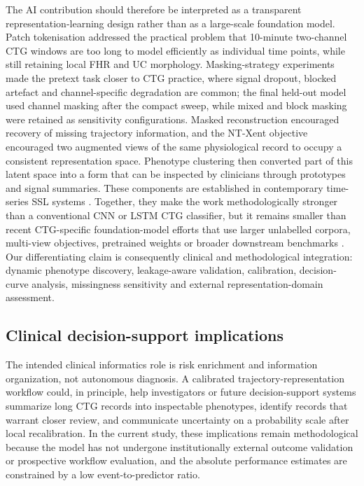 \documentclass[pdflatex,sn-nature]{sn-jnl}
\begin{document}
The AI contribution should therefore be interpreted as a transparent representation-learning design rather than as a large-scale foundation model. Patch tokenisation addressed the practical problem that 10-minute two-channel CTG windows are too long to model efficiently as individual time points, while still retaining local FHR and UC morphology. Masking-strategy experiments made the pretext task closer to CTG practice, where signal dropout, blocked artefact and channel-specific degradation are common; the final held-out model used channel masking after the compact sweep, while mixed and block masking were retained as sensitivity configurations. Masked reconstruction encouraged recovery of missing trajectory information, and the NT-Xent objective encouraged two augmented views of the same physiological record to occupy a consistent representation space. Phenotype clustering then converted part of this latent space into a form that can be inspected by clinicians through prototypes and signal summaries. These components are established in contemporary time-series SSL systems \cite{nie2023,yue2022,zhang2022tfc,goswami2024moment}. Together, they make the work methodologically stronger than a conventional CNN or LSTM CTG classifier, but it remains smaller than recent CTG-specific foundation-model efforts that use larger unlabelled corpora, multi-view objectives, pretrained weights or broader downstream benchmarks \cite{fridman2026ctgfoundation,prismctg2026}. Our differentiating claim is consequently clinical and methodological integration: dynamic phenotype discovery, leakage-aware validation, calibration, decision-curve analysis, missingness sensitivity and external representation-domain assessment.

\subsection{Clinical decision-support implications}

The intended clinical informatics role is risk enrichment and information organization, not autonomous diagnosis. A calibrated trajectory-representation workflow could, in principle, help investigators or future decision-support systems summarize long CTG records into inspectable phenotypes, identify records that warrant closer review, and communicate uncertainty on a probability scale after local recalibration. In the current study, these implications remain methodological because the model has not undergone institutionally external outcome validation or prospective workflow evaluation, and the absolute performance estimates are constrained by a low event-to-predictor ratio.
\end{document}
